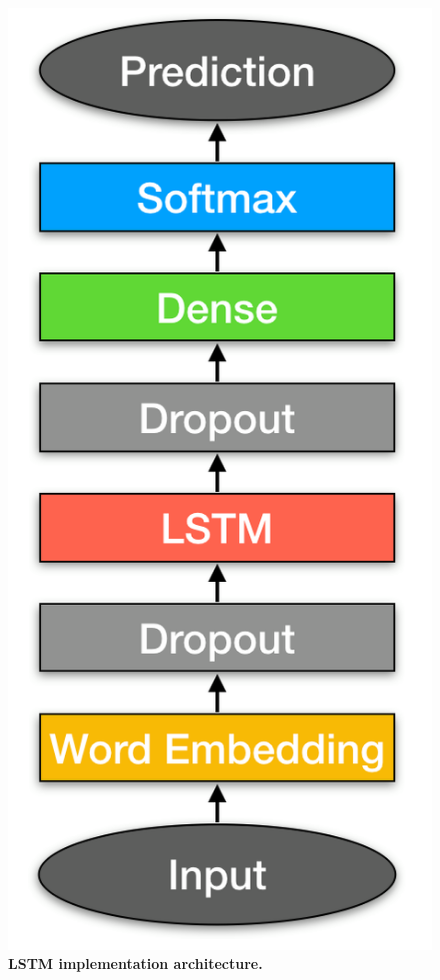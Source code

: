 \documentclass{sig-alternate-05-2015}
\begin{document}
	\begin{figure}[H]
		\centering\includegraphics[scale=0.3]{architecture} 
		\caption{\textbf{ LSTM implementation architecture.}}
	\end{figure}
	
\end{document}
